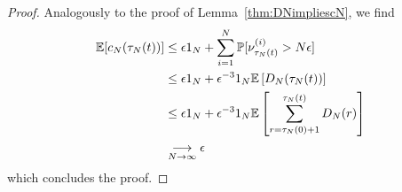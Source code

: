 \begin{proof}
Analogously to the proof of Lemma~\ref{thm:DNimpliescN}, we find
\begin{align*}
\mathbb{E}[c_N(\tau_N(t))]
&\leq \epsilon1_N + \sum_{i=1}^N \mathbb{P}[ \nu_{\tau_N(t)}^{(i)} > N\epsilon ] \\
&\leq \epsilon1_N + \epsilon^{-3}1_N \mathbb{E}\left[ D_N(\tau_N(t)) \right] \\
&\leq \epsilon1_N + \epsilon^{-3}1_N
        \mathbb{E}\left[ \sum_{r=\tau_N(0)+1}^{\tau_N(t)} D_N(r) \right] \\
&\underset{N\to\infty}{\longrightarrow} \epsilon
\end{align*}
which concludes the proof.
\end{proof}


